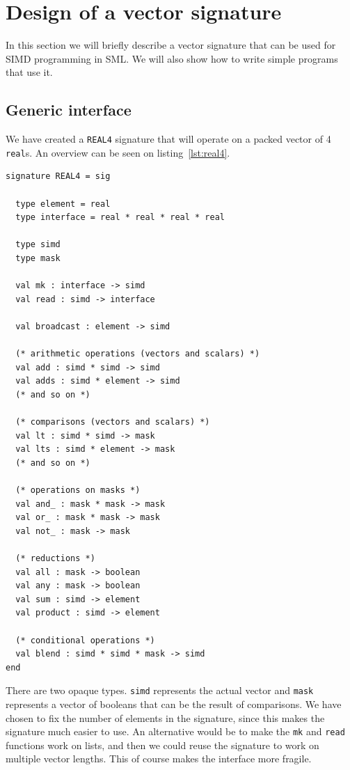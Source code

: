 \documentclass{article}
\begin{document}
\section{Design of a vector signature}

In this section we will briefly describe a vector signature that can be used for SIMD programming in SML. We will also show how to write simple programs that use it.

\subsection{Generic interface}

We have created a \verb!REAL4! signature that will operate on a packed vector of 4 \verb!real!s. An overview can be seen on listing~\ref{lst:real4}.

\begin{lstlisting}[frame=single, caption=\texttt{REAL4} vector signature, label={lst:real4}]
signature REAL4 = sig

  type element = real
  type interface = real * real * real * real

  type simd
  type mask

  val mk : interface -> simd
  val read : simd -> interface

  val broadcast : element -> simd

  (* arithmetic operations (vectors and scalars) *)
  val add : simd * simd -> simd
  val adds : simd * element -> simd
  (* and so on *)

  (* comparisons (vectors and scalars) *)
  val lt : simd * simd -> mask
  val lts : simd * element -> mask
  (* and so on *)

  (* operations on masks *)
  val and_ : mask * mask -> mask
  val or_ : mask * mask -> mask
  val not_ : mask -> mask

  (* reductions *)
  val all : mask -> boolean
  val any : mask -> boolean
  val sum : simd -> element
  val product : simd -> element

  (* conditional operations *)
  val blend : simd * simd * mask -> simd
end
\end{lstlisting}

There are two opaque types. \verb!simd! represents the actual vector and \verb!mask! represents a vector of booleans that can be the result of comparisons. We have chosen to fix the number of elements in the signature, since this makes the signature much easier to use. An alternative would be to make the \verb!mk! and \verb!read! functions work on lists, and then we could reuse the signature to work on multiple vector lengths. This of course makes the interface more fragile.
\end{document}
